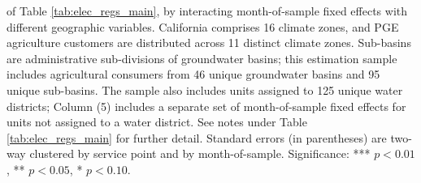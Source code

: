 \begin{table}[t!]
{of Table \ref{tab:elec_regs_main}, by interacting month-of-sample fixed effects with different geographic variables.  
California comprises 16 climate zones, and PGE agriculture customers are distributed across 11 distinct climate zones.
Sub-basins are administrative sub-divisions of groundwater basins; this estimation sample includes agricultural consumers  
from 46 unique groundwater basins and 95 unique sub-basins.  
The sample also includes units assigned to 125 unique water districts; Column (5) includes a separate set of month-of-sample 
fixed effects for units not assigned to a water district.
See notes under Table \ref{tab:elec_regs_main} for further detail. 
Standard errors (in parentheses) are two-way clustered by service point and by month-of-sample.
Significance: *** $p < 0.01$, ** $p < 0.05$, * $p < 0.10$.
}
\end{table}
